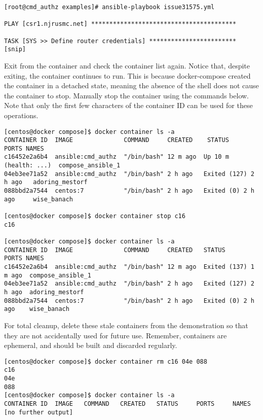 \begin{verbatim}
[root@cmd_authz examples]# ansible-playbook issue31575.yml 

PLAY [csr1.njrusmc.net] ****************************************

TASK [SYS >> Define router credentials] ************************
[snip]
\end{verbatim}

Exit from the container and check the container list again. Notice that,
despite exiting, the container continues to run. This is because
docker-compose created the container in a detached state, meaning the absence
of the shell does not cause the container to stop. Manually stop the container
using the commands below. Note that only the first few characters of the
container ID can be used for these operations.

\begin{verbatim}
[centos@docker compose]$ docker container ls -a
CONTAINER ID  IMAGE              COMMAND     CREATED    STATUS          PORTS NAMES
c16452e2a6b4  ansible:cmd_authz  "/bin/bash" 12 m ago  Up 10 m (health: ...)  compose_ansible_1
04eb3ee71a52  ansible:cmd_authz  "/bin/bash" 2 h ago   Exited (127) 2 h ago   adoring_mestorf
088bbd2a7544  centos:7           "/bin/bash" 2 h ago   Exited (0) 2 h ago     wise_banach

[centos@docker compose]$ docker container stop c16
c16

[centos@docker compose]$ docker container ls -a
CONTAINER ID  IMAGE              COMMAND     CREATED   STATUS          PORTS NAMES
c16452e2a6b4  ansible:cmd_authz  "/bin/bash" 12 m ago  Exited (137) 1 m ago  compose_ansible_1
04eb3ee71a52  ansible:cmd_authz  "/bin/bash" 2 h ago   Exited (127) 2 h ago  adoring_mestorf
088bbd2a7544  centos:7           "/bin/bash" 2 h ago   Exited (0) 2 h ago    wise_banach
\end{verbatim}

For total cleanup, delete these stale containers from the demonstration so
that they are not accidentally used for future use. Remember, containers are
ephemeral, and should be built and discarded regularly.


\begin{verbatim}
[centos@docker compose]$ docker container rm c16 04e 088
c16
04e
088
[centos@docker compose]$ docker container ls -a
CONTAINER ID  IMAGE   COMMAND   CREATED   STATUS     PORTS     NAMES
[no further output]
\end{verbatim}

